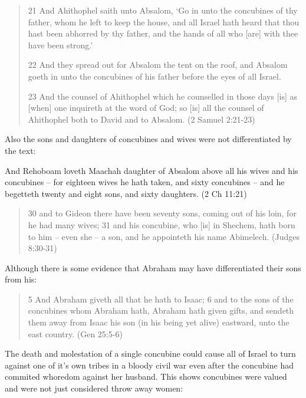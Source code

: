 \documentclass[11pt]{article}
\begin{document}
{\begin{quote}
21 And Ahithophel saith unto Absalom, `Go in unto the concubines of thy father, whom he left to keep the house, and all Israel hath heard that thou hast been abhorred by thy father, and the hands of all who [are] with thee have been strong.'

22 And they spread out for Absalom the tent on the roof, and Absalom goeth in unto the concubines of his father before the eyes of all Israel.

23 And the counsel of Ahithophel which he counselled in those days [is] as [when] one inquireth at the word of God; so [is] all the counsel of Ahithophel both to David and to Absalom.
(2 Samuel 2:21-23)
\end{quote}

Also the sons and daughters of concubines and wives were not differentiated by the text:

And Rehoboam loveth Maachah daughter of Absalom above all his wives and his concubines -- for eighteen wives he hath taken, and sixty concubines -- and he begetteth twenty and eight sons, and sixty daughters. (2 Ch 11:21)
\begin{quote}
30 and to Gideon there have been seventy sons, coming out of his loin, for he had many wives;
31 and his concubine, who [is] in Shechem, hath born to him -- even she -- a son, and he appointeth his name Abimelech. (Judges 8:30-31)
\end{quote}

Although there is some evidence that Abraham may have differentiated their sons from his:
\begin{quote}
5 And Abraham giveth all that he hath to Isaac;
6 and to the sons of the concubines whom Abraham hath, Abraham hath given gifts, and sendeth them away from Isaac his son (in his being yet alive) eastward, unto the east country. (Gen 25:5-6)
\end{quote}

The death and molestation of a single concubine could cause all of Israel to turn against one of it's own tribes in a bloody civil war even after the concubine had commited whoredom against her husband. This shows concubines were valued and were not just considered throw away women:

}
\end{document}
